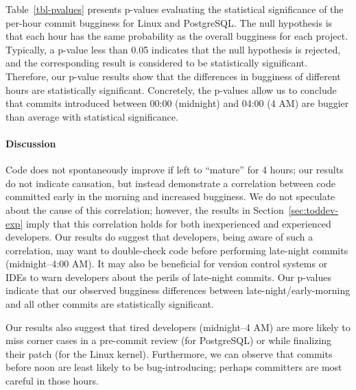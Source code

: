 Table~\ref{tbl-pvalues} presents p-values evaluating the
statistical significance of the per-hour commit bugginess for
Linux and PostgreSQL.  The null hypothesis is that each
hour has the same probability as the overall bugginess for each
project.  Typically, a p-value less than 0.05 indicates that the null
hypothesis is rejected, and the corresponding result is considered to
be statistically significant.  Therefore, our p-value results show
that the differences in bugginess of different hours are statistically
significant. Concretely, the p-values allow us to conclude that
commits introduced between 00:00 (midnight) and 04:00 (4 AM) are
buggier than average with statistical significance.


\newpage
\paragraph{Discussion}

Code does not spontaneously improve if left to ``mature'' for 4 hours; 
our results do not indicate causation,
but instead demonstrate a correlation between code committed early in the 
morning and increased bugginess. We do not speculate about the cause
of this correlation; however, the results in Section~\ref{sec:toddev-exp}
imply that this correlation holds for both inexperienced and experienced
developers.
Our results do suggest that developers, being aware of such a 
correlation, may want to double-check code before performing
late-night commits (midnight--4:00 AM). It may also be
beneficial for version control systems or IDEs to warn developers about
the perils of late-night
commits. 
Our p-values indicate that our
observed bugginess differences between late-night/early-morning and all other commits are statistically significant.

Our results also suggest that tired developers (midnight--4 AM) are more likely to
miss corner cases in a pre-commit review (for PostgreSQL) or while finalizing
their patch (for the Linux kernel). Furthermore, we can observe that commits
before noon are least likely to be bug-introducing; perhaps committers are most
careful in those hours.

